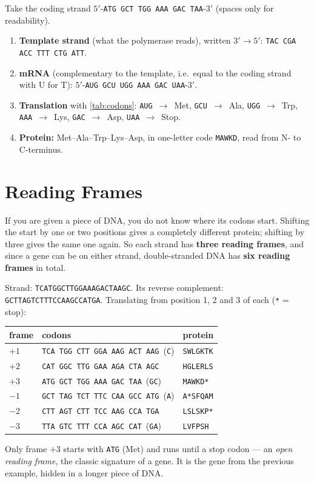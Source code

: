 \documentclass[11pt, oneside]{book}
\newcommand{\seq}[1]{\texttt{#1}}
\let\originalsection\section
\renewcommand{\section}{\Needspace{7\baselineskip}\originalsection}
\begin{document}
\begin{exbox}[title={From gene to protein}]
Take the coding strand $5'$-\seq{ATG GCT TGG AAA GAC TAA}-$3'$ (spaces only
for readability).
\begin{enumerate}
  \item \textbf{Template strand} (what the polymerase reads), written
    $3' \to 5'$: \seq{TAC CGA ACC TTT CTG ATT}.
  \item \textbf{mRNA} (complementary to the template, i.e.\ equal to the coding
    strand with U for T): $5'$-\seq{AUG GCU UGG AAA GAC UAA}-$3'$.
  \item \textbf{Translation} with \cref{tab:codons}:
    \seq{AUG}~$\to$~Met, \seq{GCU}~$\to$~Ala, \seq{UGG}~$\to$~Trp,
    \seq{AAA}~$\to$~Lys, \seq{GAC}~$\to$~Asp, \seq{UAA}~$\to$~Stop.
  \item \textbf{Protein:} Met--Ala--Trp--Lys--Asp, in one-letter code
    \seq{MAWKD}, read from N- to C-terminus.
\end{enumerate}
\end{exbox}

\section{Reading Frames}
\label{sec:reading-frames}

If you are given a piece of DNA, you do not know where its codons start.
Shifting the start by one or two positions gives a completely different
protein; shifting by three gives the same one again. So each strand has
\textbf{three reading frames}, and since a gene can be on either strand,
double-stranded DNA has \textbf{six reading frames} in total.

\begin{exbox}[title={Six reading frames of one DNA snippet}]
\small
Strand: \seq{TCATGGCTTGGAAAGACTAAGC}. Its reverse complement:
\seq{GCTTAGTCTTTCCAAGCCATGA}. Translating from position 1, 2 and 3 of each
(\seq{*} = stop):

\medskip
\centering
\begin{tabular}{@{}lll@{}}
\toprule
frame & codons & protein \\
\midrule
$+1$ & \seq{TCA TGG CTT GGA AAG ACT AAG}~(\seq{C}) & \seq{SWLGKTK} \\
$+2$ & \seq{CAT GGC TTG GAA AGA CTA AGC} & \seq{HGLERLS} \\
$+3$ & \seq{ATG GCT TGG AAA GAC TAA}~(\seq{GC}) & \seq{MAWKD*} \\
$-1$ & \seq{GCT TAG TCT TTC CAA GCC ATG}~(\seq{A}) & \seq{A*SFQAM} \\
$-2$ & \seq{CTT AGT CTT TCC AAG CCA TGA} & \seq{LSLSKP*} \\
$-3$ & \seq{TTA GTC TTT CCA AGC CAT}~(\seq{GA}) & \seq{LVFPSH} \\
\bottomrule
\end{tabular}

\raggedright
Only frame $+3$ starts with \seq{ATG} (Met) and runs until a stop codon --- an
\emph{open reading frame}, the classic signature of a gene. It is the gene
from the previous example, hidden in a longer piece of DNA.
\end{exbox}
\end{document}
